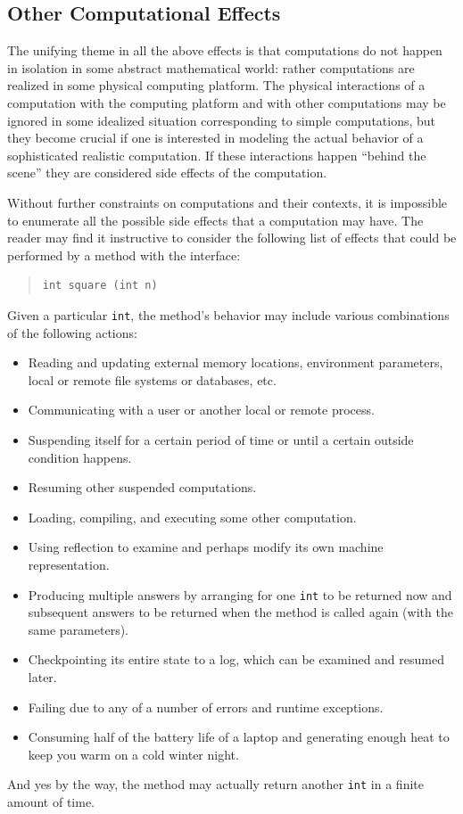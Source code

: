 \documentclass{article}
\theoremstyle{remark}
\begin{document}
\subsection*{Other Computational Effects}

The unifying theme in all the above effects is that computations do not
happen in isolation in some abstract mathematical world: rather computations
are realized in some physical computing platform. The physical interactions
of a computation with the computing platform and with other computations may
be ignored in some idealized situation corresponding to simple computations,
but they become crucial if one is interested in modeling the actual behavior
of a sophisticated realistic computation. If these interactions happen
``behind the scene'' they are considered side effects of the computation.

Without further constraints on computations and their contexts, it is
impossible to enumerate all the possible side effects that a computation may
have. The reader may find it instructive to consider the following list of
effects that could be performed by a method with the interface:
\begin{quote}
\begin{verbatim} 
int square (int n)
\end{verbatim}
\end{quote}
Given a particular \verb|int|, the method's behavior may include various
combinations of the following actions:
\begin{itemize}
\item Reading and updating external memory locations, environment parameters,
local or remote file systems or databases, etc.
\item Communicating with a user or another local or remote process.
\item Suspending itself for a certain period of time or until a certain
outside condition happens.
\item Resuming other suspended computations.
\item Loading, compiling, and executing some other computation.
\item Using reflection to examine and perhaps modify its own machine
representation.
\item Producing multiple answers by arranging for one \verb|int| to be
returned now and subsequent answers to be returned when the method is called
again (with the same parameters). 
\item Checkpointing its entire state to a log, which can be examined and
resumed later.
\item Failing due to any of a number of errors and runtime exceptions.
\item Consuming half of the battery life of a laptop and generating enough
heat to keep you warm on a cold winter night.
\end{itemize}
And yes by the way, the method may actually return another \verb|int| in a
finite amount of time.
\end{document}
